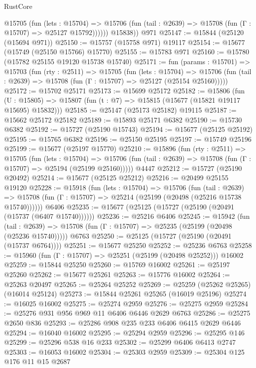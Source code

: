 \begin{lexlean}{RustCore}
\begin{coremodule}
            @15705
              (fun (lets : @15704) =>
              @15706 (fun (tail : @2639) => @15708 (fun (Γ : @15707) => @25127 @15792))))))
        @15838))
    @971
@25147 := @15844 (@25120 (@15694 @971))
@25150 := @15757 (@15758 @971) @19117
@25154 := @15677 (@15749 (@25150 @15766) @15770)
@25155 := @15783 @971
@25160 := @15780 (@15782 @25155 @19120 @15738 @15740)
@25171 := fun (params : @15701) =>
  @15703
    (fun (rty : @2511) =>
    @15705
      (fun (lets : @15704) =>
      @15706 (fun (tail : @2639) => @15708 (fun (Γ : @15707) => @25127 (@25154 @25160)))))
@25172 := @15702 @25171
@25173 := @15699 @25172
@25182 := @15806
    (fun (U : @15805) => @15807 (fun (t : @7) => @15815 (@15677 (@15821 @19117 @15695) @15832)))
@25185 := @25147 (@25173 @25182) @19115
@25187 := @15662 @25172 @25182
@25189 := @15893 @25171 @6382
@25190 := @15730 @6382
@25192 := @15727 (@25190 @15743)
@25194 := @15677 (@25125 @25192)
@25195 := @15765 @6382
@25196 := @25150 @25195
@25197 := @15749 @25196
@25199 := @15677 (@25197 @15770)
@25210 := @15896
    (fun (rty : @2511) =>
    @15705
      (fun (lets : @15704) =>
      @15706 (fun (tail : @2639) => @15708 (fun (Γ : @15707) => @25194 (@25199 @25160)))))
    @4447
@25212 := @15727 (@25190 @20492)
@25214 := @15677 (@25125 @25212)
@25216 := @20499 @25155 @19120
@25228 := @15918
    (fun (lets : @15704) =>
    @15706
      (fun (tail : @2639) =>
      @15708 (fun (Γ : @15707) => @25214 (@25199 (@20498 (@25216 @15738 @15740))))))
    @6406
@25235 := @15677 (@25125 (@15727 (@25190 (@20491 (@15737 (@6407 @15740))))))
@25236 := @25216 @6406
@25245 := @15942
    (fun (tail : @2639) => @15708 (fun (Γ : @15707) => @25235 (@25199 (@20498 (@25236 @15740)))))
    @6763
@25250 := @25125 (@15727 (@25190 (@20491 (@15737 @6764))))
@25251 := @15677 @25250
@25252 := @25236 @6763
@25258 := @15960 (fun (Γ : @15707) => @25251 (@25199 (@20498 @25252))) @16002
@25259 := @15844 @25250
@25260 := @15769 @16002
@25261 := @25197 @25260
@25262 := @15677 @25261
@25263 := @15776 @16002
@25264 := @25263 @20497
@25265 := @25264 @25252
@25269 := @25259 (@25262 @25265) (@16014 @25124)
@25273 := @15844 @25261 @25265 (@16019 @25196)
@25274 := @16025 @16002
@25275 := @25274 @2959
@25276 := @25275 @2959
@25284 := @25276 @931 @956 @969 @11 @6406 @6446 @2629 @6763
@25286 := @25275 @2650 @836
@25293 := @25286 @908 @235 @233 @6406 @6415 @2629 @6446
@25294 := @16040 @16002
@25295 := @25294 @2959
@25296 := @25295 @146
@25299 := @25296 @538 @16 @233
@25302 := @25299 @6406 @6413 @2747
@25303 := @16053 @16002
@25304 := @25303 @2959
@25309 := @25304 @125 @176 @11 @15 @2687

\end{coremodule}
\end{lexlean}
